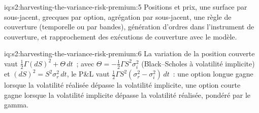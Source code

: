 \begin{solution}{iq:s2:harvesting-the-variance-risk-premium:5}
Positions et prix, une surface par sous-jacent, grecques par option, agrégation par sous-jacent, une règle de couverture (temporelle ou par bandes), génération d'ordres dans
l'instrument de couverture, et rapprochement des exécutions de couverture avec le modèle.
\end{solution}

\begin{solution}{iq:s2:harvesting-the-variance-risk-premium:6}
La variation de la position couverte vaut $\tfrac12\Gamma(dS)^2 + \Theta\,dt$~; avec $\Theta = -\tfrac12\Gamma S^2\sigma_i^2$ (Black--Scholes à volatilité implicite) et
$(dS)^2 = S^2\sigma_r^2\,dt$, le P\&L vaut $\tfrac12\Gamma S^2(\sigma_r^2 - \sigma_i^2)\,dt$~: une option longue gagne lorsque la volatilité réalisée dépasse la volatilité implicite, une option courte
gagne lorsque la volatilité implicite dépasse la volatilité réalisée, pondéré par le gamma.
\end{solution}
